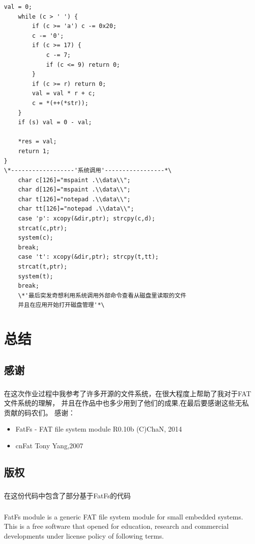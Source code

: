 \documentclass{report}
\begin{document}
\begin{CJK}{GBK}{hei}
\begin{lstlisting}[language={[ANSI]C}]
    val = 0;
    while (c > ' ') {
        if (c >= 'a') c -= 0x20;
        c -= '0';
        if (c >= 17) {
            c -= 7;
            if (c <= 9) return 0;
        }
        if (c >= r) return 0;
        val = val * r + c;
        c = *(++(*str));
    }
    if (s) val = 0 - val;

    *res = val;
    return 1;
}
\*------------------'系统调用'-----------------*\
    char c[126]="mspaint .\\data\\";
    char d[126]="mspaint .\\data\\";
    char t[126]="notepad .\\data\\";
    char tt[126]="notepad .\\data\\";
    case 'p': xcopy(&dir,ptr); strcpy(c,d);
    strcat(c,ptr);
    system(c);
    break;
    case 't': xcopy(&dir,ptr); strcpy(t,tt);
    strcat(t,ptr);
    system(t);
    break;
    \*'最后突发奇想利用系统调用外部命令查看从磁盘里读取的文件
    并且在应用开始打开磁盘管理'*\
\end{lstlisting}
\chapter{总结}
\section{感谢}
\paragraph{}
在这次作业过程中我参考了许多开源的文件系统，在很大程度上帮助了我对于FAT文件系统的理解，
并且在作品中也多少用到了他们的成果,在最后要感谢这些无私贡献的码农们。
感谢：
\begin{itemize}
  \item  FatFs - FAT file system module  R0.10b  (C)ChaN, 2014
  \item  cnFat Tony Yang,2007
\end{itemize}
\section{版权}
\paragraph{} 在这份代码中包含了部分基于FatFs的代码
\paragraph{} FatFs module is a generic FAT file system module for small embedded systems.
This is a free software that opened for education, research and commercial
developments under license policy of following terms.

\end{CJK}
\end{document}
